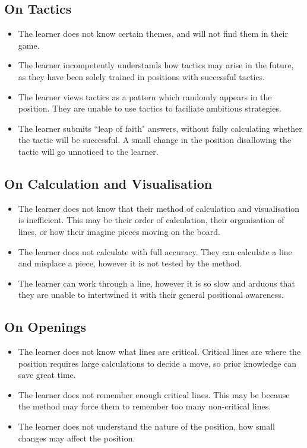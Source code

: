 \documentclass{article}
\begin{document}
\subsection{On Tactics}
\begin{itemize}
  \item The learner does not know certain themes, and will not find them in their game.
  \item The learner incompetently understands how tactics may arise in the future, as they have been solely trained in positions with successful tactics.
  \item The learner views tactics as a pattern which randomly appears in the position. They are unable to use tactics to faciliate ambitious strategies.
  \item The learner submits ``leap of faith" answers, without fully calculating whether the tactic will be successful. A small change in the position disallowing the tactic will go unnoticed to the learner.
\end{itemize}
\subsection{On Calculation and Visualisation}
\begin{itemize}
  \item The learner does not know that their method of calculation and visualisation is inefficient. This may be their order of calculation, their organisation of lines, or how their imagine pieces moving on the board.
  \item The learner does not calculate with full accuracy. They can calculate a line and misplace a piece, however it is not tested by the method.
  \item The learner can work through a line, however it is so slow and arduous that they are unable to intertwined it with their general positional awareness.
\end{itemize}
\subsection{On Openings}
\begin{itemize}
  \item The learner does not know what lines are critical. Critical lines are where the position requires large calculations to decide a move, so prior knowledge can save great time.
  \item The learner does not remember enough critical lines. This may be because the method may force them to remember too many non-critical lines.
  \item The learner does not understand the nature of the position, how small changes may affect the position.
\end{itemize}
\end{document}
